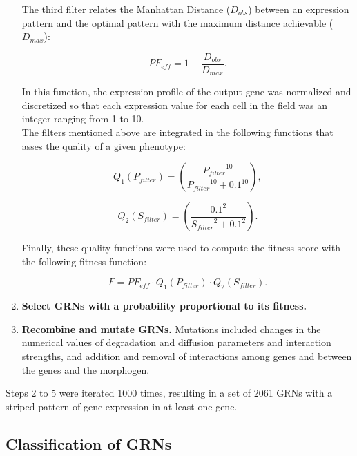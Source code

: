 \documentclass[10pt,letterpaper]{article}
\begin{document}
\begin{enumerate}
 The third filter relates the Manhattan Distance ($D_{obs}$) between an
 expression pattern and the optimal pattern with the maximum distance achievable
 ($D_{max}$):
 
 \begin{equation}
  \mathit{PF}_{eff} = 1 - \frac{D_{obs}}{D_{max}}.
 \end{equation}
 
 In this function, the expression profile of the output gene was normalized and
 discretized so that each expression value for each cell in the field was an
 integer ranging from 1 to 10.\\
 
 The filters mentioned above are integrated in the following functions that 
 asses the quality of a given phenotype:
 
 \begin{equation}
  Q_1(P_{filter}) = \left( \frac{ {P_{filter}}^{10} }{ {P_{filter}}^{10} + 
  0.1^{10} } \right),
 \end{equation}
 
 \begin{equation}
  Q_2(S_{filter}) = \left( \frac{ 0.1^2 }{ {S_{filter}}^2 + 0.1^2 } \right).
 \end{equation}

 Finally, these quality functions were used to compute the fitness score with
 the following fitness function:
 
 \begin{equation}
  F = \mathit{PF_{eff}} \cdot Q_1(P_{filter}) \cdot Q_2(S_{filter}).
 \end{equation}

 \item{\bf Select GRNs with a probability proportional to its fitness.}
 
 \item{\bf Recombine and mutate GRNs.} Mutations included changes in the
 numerical values of degradation and diffusion parameters and interaction
 strengths, and addition and removal of interactions among genes and between the
 genes and the morphogen.
\end{enumerate}

Steps 2 to 5 were iterated 1000 times, resulting in a set of 2061 GRNs with a
striped pattern of gene expression in at least one gene.

\subsection*{Classification of GRNs}
\end{document}
